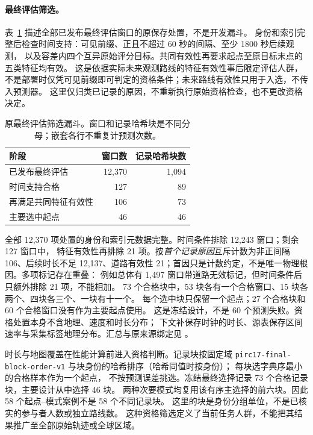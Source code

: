 \paragraph{最终评估筛选。}\label{sec:final-cohort-funnel}\hypertarget{sec:final-cohort-funnel}{}
表~\ref{tab:final-cohort-funnel} 描述全部已发布最终评估窗口的原保存处置，不是开发漏斗。
身份和索引完整后检查时间支持：可见前缀、正且不超过 60 秒的间隔、至少 1800 秒后续观测，
以及容差内四个互异原始评分目标。共同有效性再要求起点至原目标末点的五类特征均有效。
这是依据实际未来观测路线的特征有效性事后限定评估人群，
不是部署时仅凭可见前缀即可判定的资格条件；未来路线有效性只用于入选，不传入预测器。
这里仅归类已记录的原因，不重新执行原始资格检查，也不更改资格决定。

\begin{table}[htbp]
\centering\small
\caption{原最终评估筛选漏斗。窗口和记录哈希块是不同分母；嵌套各行不重复计预测次数。}
\label{tab:final-cohort-funnel}\hypertarget{tab:final-cohort-funnel}{}
\begin{tabular}{@{}lrr@{}}
\toprule
阶段 & 窗口数 & 记录哈希块数\\
\midrule
已发布最终评估 & 12,370 & 1,094\\
时间支持合格 & 127 & 89\\
再满足共同特征有效性 & 106 & 73\\
主要选中起点 & 46 & 46\\
\bottomrule
\end{tabular}
\end{table}
全部 12,370 项处置的身份和索引元数据完整。时间条件排除 12,243 窗口；剩余 127 窗口中，
特征有效性再排除 21 项。按\emph{首个记录原因}互斥计数为非正间隔 106、后续时长不足
12,137、道路有效性 21；首因只是计数约定，不是唯一物理根因。多项标记存在重叠：
例如总体有 1,497 窗口带道路无效标记，但时间条件后只额外排除 21 项，不能相加。
73 个合格块中，53 块各有一个合格窗口、15 块各两个、四块各三个、一块有十一个。
每个选中块只保留一个起点；27 个合格块和 60 个合格窗口没有作为主要起点使用。
这是冻结设计，不是 60 个预测失败。资格处置本身不含地理、速度和时长分布；
下文补保存时钟的时长、源表保存区间速率与采集标签地理分布。汇总与原来源绑定见
。

时长与地图覆盖在性能计算前进入资格判断。记录块按固定域
\texttt{pirc17-final-block-order-v1} 与块身份的哈希排序（哈希同值时按身份）；
每块选字典序最小的合格样本作为一个起点，
不按预测误差挑选。冻结最终选择记录 73 个合格记录块，主要设计从中选择 46 块。
两种次要模式均复用该有序主选择的前六块。因此 58 个起点--模式案例不是 58 个不同记录块。
这里的块是身份分组单位，不是已核实的参与者人数或独立路线数。
这种资格筛选定义了当前任务人群，不能把其结果推广至全部原始轨迹或全球区域。

